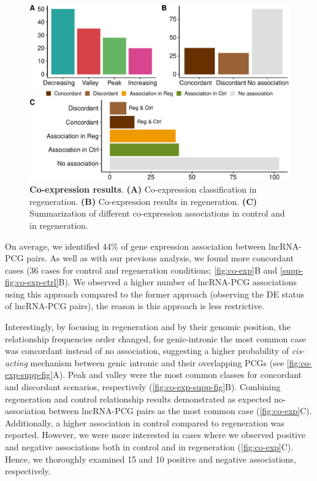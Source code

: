 \begin{figure}[ht!]
  \centering
  \includegraphics[scale=0.6]{plots/results/dme/co.expression.results.pdf}
  \caption[Co-expression results]{\textbf{Co-expression results}. \textbf{(A)} Co-expression classification in regeneration. \textbf{(B)} Co-expression results in regeneration. \textbf{(C)} Summarization of different co-expression associations in control and in regeneration.}
  \label{fig:co-exp}
\end{figure}

On average, we identified 44\% of gene expression association between lncRNA-PCG pairs. As well as with our previous analysis, we found more concordant cases (36 cases for control and regeneration conditions; \autoref{fig:co-exp}B and \autoref{supp-fig:co-exp-ctrl}B). We observed a higher number of lncRNA-PCG associations using this approach compared to the former approach (observing the DE status of lncRNA-PCG pairs), the reason is this approach is less restrictive. 

Interestingly, by focusing in regeneration and by their genomic position, the relationship frequencies order changed, for genic-intronic the most common case was concordant instead of no association, suggesting a higher probability of \textit{cis-acting}  mechanism between genic intronic and their overlapping PCGs\autocite{perez_blister, pelechano_2013} (see \autoref{fig:co-exp-supp-fig}A). Peak and valley were the most common classes for concordant and discordant scenarios, respectively (\autoref{fig:co-exp-supp-fig}B). Combining regeneration and control relationship results demonstrated as expected no-association between lncRNA-PCG pairs as the most common case (\autoref{fig:co-exp}C). Additionally, a higher association in control compared to regeneration was reported. However, we were more interested in cases where we observed positive and negative associations both in control and in regeneration (\autoref{fig:co-exp}C). Hence, we thoroughly examined 15 and 10 positive and negative associations, respectively.

